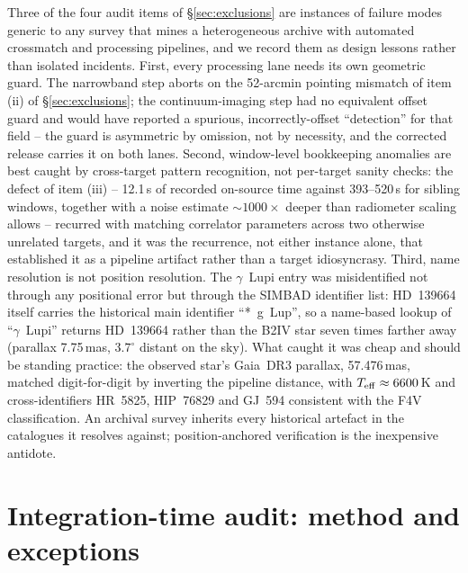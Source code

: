 \documentclass{openjournal}
\begin{document}
Three of the four audit items of \S\ref{sec:exclusions} are instances
of failure modes generic to any survey that mines a heterogeneous
archive with automated crossmatch and processing pipelines, and we
record them as design lessons rather than isolated incidents. First,
every processing lane needs its own geometric guard. The narrowband
step aborts on the 52-arcmin pointing mismatch of item (ii) of
\S\ref{sec:exclusions}; the continuum-imaging step had no equivalent
offset guard and would have reported a spurious, incorrectly-offset
``detection'' for that field -- the guard is asymmetric by omission,
not by necessity, and the corrected release carries it on both lanes.
Second, window-level bookkeeping anomalies are best caught by
cross-target pattern recognition, not per-target sanity checks: the
defect of item (iii) -- 12.1\,s of recorded on-source time against
393--520\,s for sibling windows, together with a noise estimate
${\sim}1000\times$ deeper than radiometer scaling allows -- recurred
with matching correlator parameters across two otherwise unrelated
targets, and it was the recurrence, not either instance alone, that
established it as a pipeline artifact rather than a target
idiosyncrasy. Third, name resolution is not position resolution. The
$\gamma$~Lupi entry was misidentified not through any positional error
but through the SIMBAD identifier list: HD~139664 itself carries the
historical main identifier ``*~g~Lup'', so a name-based lookup of
``$\gamma$~Lupi'' returns HD~139664 rather than the B2IV star seven
times farther away (parallax 7.75\,mas, $3.7^{\circ}$ distant on the
sky). What caught it was cheap and should be standing practice: the
observed star's Gaia~DR3 parallax, 57.476\,mas, matched
digit-for-digit by inverting the pipeline distance, with
$T_{\rm eff}\approx6600$\,K and cross-identifiers HR~5825, HIP~76829
and GJ~594 consistent with the F4V classification. An archival survey
inherits every historical artefact in the catalogues it resolves
against; position-anchored verification is the inexpensive antidote.

\section{Integration-time audit: method and exceptions}
\label{app:audit}
\end{document}
